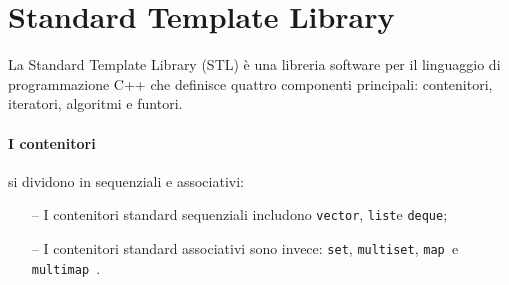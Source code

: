 \section{Standard Template Library}

La Standard Template Library (STL) è una libreria software per il linguaggio di programmazione C++ che definisce quattro componenti principali: contenitori, iteratori, algoritmi e funtori.
\paragraph{I contenitori } si dividono in sequenziali e associativi:

\begin{itemize}
    \item[--] I contenitori standard sequenziali includono \verb|vector|, \verb|list|e \verb|deque|;
    \item[--] I contenitori standard associativi sono invece: \verb|set|, \verb|multiset|,  \verb|map |e \verb|multimap |.
\end{itemize}

